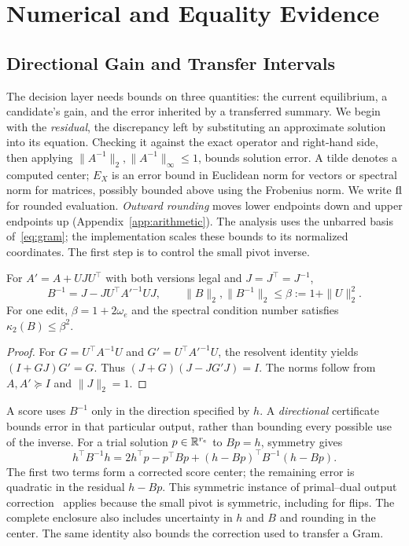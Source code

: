 \section{Numerical and Equality Evidence}
\label{sec:numerics}

\subsection{Directional Gain and Transfer Intervals}
The decision layer needs bounds on three quantities: the current equilibrium, a candidate's gain, and the error inherited by a transferred summary. We begin with the \emph{residual}, the discrepancy left by substituting an approximate solution into its equation. Checking it against the exact operator and right-hand side, then applying $\|A^{-1}\|_2,\|A^{-1}\|_\infty\le1$, bounds solution error. A tilde denotes a computed center; $E_X$ is an error bound in Euclidean norm for vectors or spectral norm for matrices, possibly bounded above using the Frobenius norm. We write $\operatorname{fl}$ for rounded evaluation. \emph{Outward rounding} moves lower endpoints down and upper endpoints up (Appendix~\ref{app:arithmetic}). The analysis uses the unbarred basis of~\eqref{eq:gram}; the implementation scales these bounds to its normalized coordinates. The first step is to control the small pivot inverse.

\begin{theorem}\label{thm:pivot}
For $A'=A+UJU^\top$ with both versions legal and $J=J^\top=J^{-1}$,
\begin{equation}
 B^{-1}=J-JU^\top A'^{-1}UJ,\qquad
 \|B\|_2,\|B^{-1}\|_2\le\beta:=1+\|U\|_2^2.
 \label{eq:pivot-bound}
\end{equation}
For one edit, $\beta=1+2\omega_e$ and the spectral condition number satisfies $\kappa_2(B)\le\beta^2$.
\end{theorem}
\begin{proof}
For $G=U^\top A^{-1}U$ and $G'=U^\top A'^{-1}U$, the resolvent identity yields $(I+GJ)G'=G$. Thus $(J+G)(J-JG'J)=I$. The norms follow from $A,A'\succeq I$ and $\|J\|_2=1$.
\end{proof}

A score uses $B^{-1}$ only in the direction specified by $h$. A \emph{directional} certificate bounds error in that particular output, rather than bounding every possible use of the inverse. For a trial solution $p\in\mathbb R^{r_e}$ to $Bp=h$, symmetry gives
\begin{equation}
 h^\top B^{-1}h=2h^\top p-p^\top Bp
 +(h-Bp)^\top B^{-1}(h-Bp).
 \label{eq:direction-identity}
\end{equation}
The first two terms form a corrected score center; the remaining error is quadratic in the residual $h-Bp$. This symmetric instance of primal--dual output correction~\cite{BalabanovNouy2019} applies because the small pivot is symmetric, including for flips. The complete enclosure also includes uncertainty in $h$ and $B$ and rounding in the center. The same identity also bounds the correction used to transfer a Gram.

